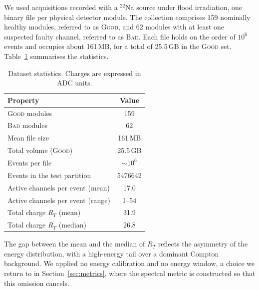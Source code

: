 \documentclass[10pt,conference]{IEEEtran}
\begin{document}
We used acquisitions recorded with a $^{22}$Na source under flood irradiation,
one binary file per physical detector module. The collection comprises 159 nominally healthy
modules, referred to as \textsc{Good}, and 62 modules with at least one
suspected faulty channel, referred to as \textsc{Bad}. Each file holds on the
order of $10^{6}$ events and occupies about 161\,MB, for a total of 25.5\,GB in
the \textsc{Good} set. Table~\ref{tab:dataset} summarises the statistics.
%

\begin{table}[t]
\centering
\caption{Dataset statistics. Charges are expressed in ADC units.}
\label{tab:dataset}
\begin{tabular}{@{}lc@{}}
\toprule
\textbf{Property} & \textbf{Value} \\
\midrule
\textsc{Good} modules              & 159 \\
\textsc{Bad} modules               & 62 \\
Mean file size                     & 161\,MB \\
Total volume (\textsc{Good})       & 25.5\,GB \\
Events per file                    & $\sim 10^{6}$ \\
Events in the test partition       & \num{5476642} \\
Active channels per event (mean)   & 17.0 \\
Active channels per event (range)  & 1--54 \\
Total charge $R_T$ (mean)          & 31.9 \\
Total charge $R_T$ (median)        & 26.8 \\
\bottomrule
\end{tabular}
\end{table}

The gap between the mean and the median of $R_T$ reflects the asymmetry of the
energy distribution, with a high-energy tail over a dominant Compton
background. We applied no energy calibration and no energy window, a choice we
return to in Section~\ref{sec:metrics}, where the spectral metric is
constructed so that this omission cancels.
\end{document}
